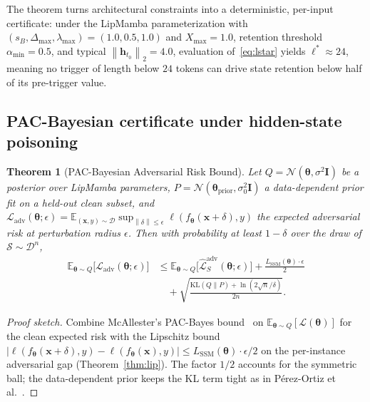 \documentclass[12pt,a4paper]{article}
\newtheorem{theorem}{Theorem}
\theoremstyle{definition}
\theoremstyle{remark}
\newcommand{\modelname}{LipMamba}
\newcommand{\E}{\mathbb{E}}
\newcommand{\Lcal}{\mathcal{L}}
\newcommand{\Dcal}{\mathcal{D}}
\newcommand{\Scal}{\mathcal{S}}
\newcommand{\Ncal}{\mathcal{N}}
\newcommand{\KL}{\mathrm{KL}}
\newcommand{\norm}[1]{\left\|#1\right\|}
\begin{document}
The theorem turns architectural constraints into a deterministic, per-input certificate: under the \modelname{} parameterization with $(s_B, \Delta_{\max}, \lambda_{\max}) = (1.0, 0.5, 1.0)$ and $X_{\max} = 1.0$, retention threshold $\alpha_{\min} = 0.5$, and typical $\norm{\mathbf{h}_{t_0}}_2 = 4.0$, evaluation of~\eqref{eq:lstar} yields $\ell^* \approx 24$, meaning no trigger of length below $24$ tokens can drive state retention below half of its pre-trigger value.

\subsection{PAC-Bayesian certificate under hidden-state poisoning}

\begin{theorem}[PAC-Bayesian Adversarial Risk Bound]
\label{thm:pacbayes}
Let $Q = \Ncal(\bm{\theta}, \sigma^2 \mathbf{I})$ be a posterior over \modelname{} parameters, $P = \Ncal(\bm{\theta}_{\mathrm{prior}}, \sigma_0^2 \mathbf{I})$ a data-dependent prior fit on a held-out clean subset, and $\Lcal_{\mathrm{adv}}(\bm{\theta}; \epsilon) = \E_{(\mathbf{x},y) \sim \Dcal} \sup_{\norm{\delta} \leq \epsilon} \ell(f_{\bm{\theta}}(\mathbf{x} + \delta), y)$ the expected adversarial risk at perturbation radius $\epsilon$. Then with probability at least $1 - \delta$ over the draw of $\Scal \sim \Dcal^n$,
\begin{align}
    \E_{\bm{\theta} \sim Q}\bigl[\Lcal_{\mathrm{adv}}(\bm{\theta}; \epsilon)\bigr]
    &\leq \E_{\bm{\theta} \sim Q}\bigl[\hat{\Lcal}_S^{\mathrm{adv}}(\bm{\theta}; \epsilon)\bigr]
    + \frac{L_{\mathrm{SSM}}(\bm{\theta}) \cdot \epsilon}{2} \nonumber\\
    &\quad + \sqrt{\frac{\KL(Q \| P) + \ln(2\sqrt{n}/\delta)}{2 n}}.
    \label{eq:pacbayes}
\end{align}
\end{theorem}

\begin{proof}[Proof sketch]
Combine McAllester's PAC-Bayes bound~\cite{mcallester2003pac,perezortiz2021tighter} on $\E_{\bm{\theta} \sim Q}[\Lcal(\bm{\theta})]$ for the clean expected risk with the Lipschitz bound $|\ell(f_{\bm{\theta}}(\mathbf{x} + \delta), y) - \ell(f_{\bm{\theta}}(\mathbf{x}), y)| \leq L_{\mathrm{SSM}}(\bm{\theta}) \cdot \epsilon / 2$ on the per-instance adversarial gap (Theorem~\ref{thm:lip}). The factor $1/2$ accounts for the symmetric ball; the data-dependent prior keeps the KL term tight as in Pérez-Ortiz et al.~\cite{perezortiz2021tighter}.
\end{proof}
\end{document}
